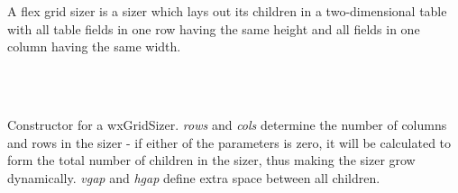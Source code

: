 \section{}\label{wxflexgridsizer}

A flex grid sizer is a sizer which lays out its children in a two-dimensional
table with all table fields in one row having the same 
height and all fields in one column having the same width.


\\
\\

\label{wxflexgridsizerwxflexgridsizer}



Constructor for a wxGridSizer. {\it rows} and {\it cols} determine the number of
columns and rows in the sizer - if either of the parameters is zero, it will be
calculated to form the total number of children in the sizer, thus making the
sizer grow dynamically. {\it vgap} and {\it hgap} define extra space between
all children.


